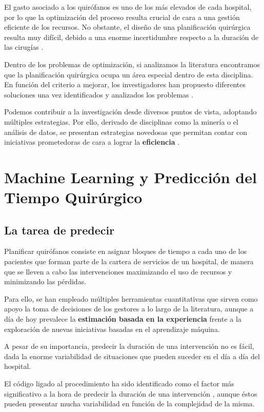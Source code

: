 El gasto asociado a los quirófanos es uno de los más elevados de cada hospital, por lo que la optimización del proceso resulta crucial de cara a una gestión eficiente de los recursos.
No obstante, el diseño de una planificación quirúrgica resulta muy difícil, debido a una enorme incertidumbre respecto a la duración de las cirugías \cite{Celik2023APrinciple}.

Dentro de los problemas de optimización, si analizamos la literatura encontramos que la planificación quirúrgica ocupa un área especial dentro de esta disciplina.
En función del criterio a mejorar, los investigadores han propuesto diferentes soluciones una vez identificados y analizados los problemas \cite{Gur2018ApplicationOverview}.

Podemos contribuir a la investigación desde diversos puntos de vista, adoptando múltiples estrategias.
Por ello, derivado de disciplinas como la minería o el análisis de datos, se presentan estrategias novedosas que permitan contar con iniciativas prometedoras de cara a lograr la \textbf{eficiencia }\cite{Schouten2023OperatingReview}.
\newpage

\section{Machine Learning y Predicción del Tiempo Quirúrgico}

\subsection{La tarea de predecir}

Planificar quirófanos consiste en asignar bloques de tiempo a cada uno de los pacientes que forman parte de la cartera de servicios de un hospital, de manera que se lleven a cabo las intervenciones maximizando el uso de recursos y minimizando las pérdidas.

Para ello, se han empleado múltiples herramientas cuantitativas que sirven como apoyo la toma de decisiones de los gestores a lo largo de la literatura, aunque a día de hoy prevalece la \textbf{estimación basada en la experiencia} \cite{Brailsford2011ORPerspective} frente a la exploración de nuevas iniciativas basadas en el aprendizaje máquina. 

A pesar de su importancia, predecir la duración de una intervención no es fácil, dada la enorme variabilidad de situaciones que pueden suceder en el día a día del hospital.

El código ligado al procedimiento ha sido identificado como el factor más significativo a la hora de predecir la duración de una intervención \cite{ShahabiKargar2014PredictingSurgery} , aunque éstos pueden presentar mucha variabilidad en función de la complejidad de la misma.

